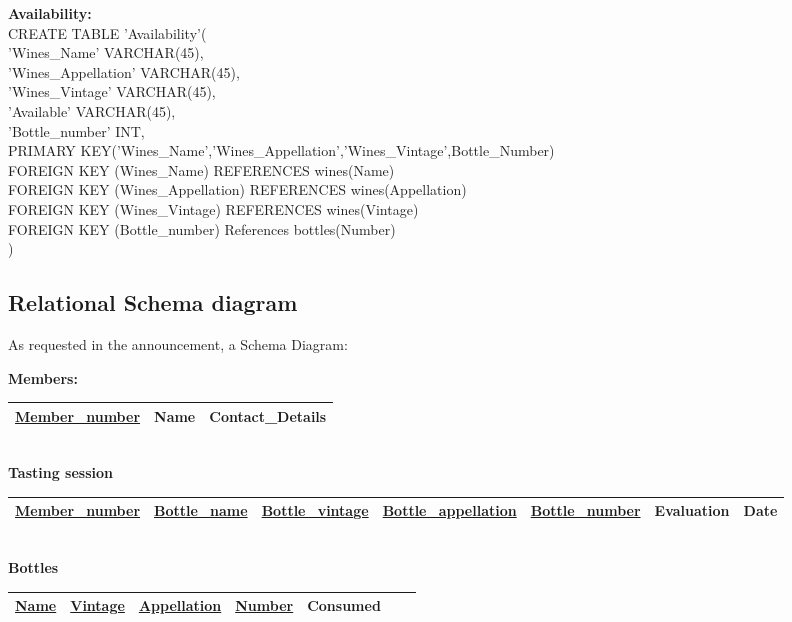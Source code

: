 \documentclass{article}
\theoremstyle{remark}
\numberwithin{equation}{section}
\begin{document}
	  \textbf{Availability:}\\
	  CREATE TABLE 'Availability'(\\
	  'Wines\_Name' VARCHAR(45),\\
	  'Wines\_Appellation' VARCHAR(45),\\
	  'Wines\_Vintage' VARCHAR(45),\\
	  'Available' VARCHAR(45),\\
	  'Bottle\_number' INT,\\
	  PRIMARY KEY('Wines\_Name','Wines\_Appellation','Wines\_Vintage',Bottle\_Number) \\
	  FOREIGN KEY (Wines\_Name) REFERENCES wines(Name)\\
	  FOREIGN KEY (Wines\_Appellation) REFERENCES wines(Appellation)\\
	  FOREIGN KEY (Wines\_Vintage) REFERENCES wines(Vintage)\\
	  FOREIGN KEY (Bottle\_number) References bottles(Number)\\
	  )\\
	  
	  

	  \subsection{Relational Schema diagram}
	  As requested in the announcement, a Schema Diagram: 
	  
	 
\textbf{Members:}\\	
	   

	\begin{tabular}{|l|l|l|}
		\hline
	\underline{ Member\_number} &	Name & Contact\_Details \\ \hline
	\end{tabular}\\

\textbf{Tasting session}\\


	\begin{tabular}{|l|l|l|l|l|l|l|}
		\hline
		\underline{ Member\_number} & \underline{Bottle\_name} & \underline{Bottle\_vintage} & \underline{ Bottle\_appellation} & \underline{Bottle\_number} & Evaluation & Date \\ \hline
	\end{tabular}\\

\textbf{Bottles}\\

\begin{tabular}{|l|l|l|l|l|l|l|}
	\hline
	\underline{ Name} & \underline{Vintage} & \underline{ Appellation} & \underline{Number} & Consumed \\ \hline
\end{tabular}\\
\end{document}
